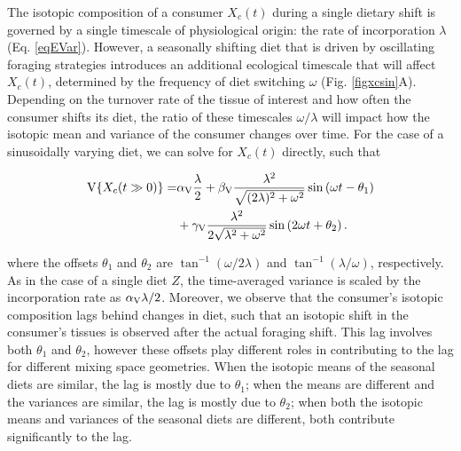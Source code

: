 \documentclass{frontiersSCNS}
\begin{document}
The isotopic composition of a consumer $X_c(t)$ during a single dietary shift is governed by a single timescale of physiological origin: the rate of incorporation $\lambda$ (Eq. \ref{eqEVar}).
However, a seasonally shifting diet that is driven by oscillating foraging strategies introduces an additional ecological timescale that will affect $X_c(t)$, determined by the frequency of diet switching $\omega$ (Fig. \ref{figxcsin}A).
Depending on the turnover rate of the tissue of interest and how often the consumer shifts its diet, the ratio of these timescales $\omega/\lambda$ will impact how the isotopic mean and variance of the consumer changes over time.
For the case of a sinusoidally varying diet, we can solve for $X_c(t)$ directly, such that

\begin{align}
  \label{eqXsin}
  \begin{split}
    {\rm V}\{X_c(t \gg 0)\} = &\alpha_{\rm V}\frac{\lambda}{2} + \beta_{\rm V}\frac{\lambda^2}{\sqrt{(2\lambda)^2 + \omega^2}}\sin\left(\omega t -\theta_1\right) \\
    &+ \gamma_{\rm V}\frac{\lambda^2}{2\sqrt{\lambda^2 + \omega^2}}\sin\left(2\omega t + \theta_2\right).
  \end{split}
\end{align}

\noindent where the offsets $\theta_1$ and $\theta_2$ are $ \tan^{-1}(\omega/2\lambda)$ and $ \tan^{-1}(\lambda/\omega)$, respectively.
As in the case of a single diet $Z$, the time-averaged variance is scaled by the incorporation rate as $\alpha_{\rm V}\lambda/2$.
Moreover, we observe that the consumer's isotopic composition lags behind changes in diet, such that an isotopic shift in the consumer's tissues is observed after the actual foraging shift.
This lag involves both $\theta_1$ and $\theta_2$, however these offsets play different roles in contributing to the lag for different mixing space geometries.
When the isotopic means of the seasonal diets are similar, the lag is mostly due to $\theta_1$; when the means are different and the variances are similar, the lag is mostly due to $\theta_2$; when both the isotopic means and variances of the seasonal diets are different, both contribute significantly to the lag.
\end{document}
